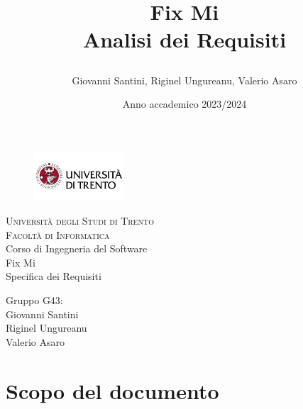 \documentclass{report}
\title{

	Fix Mi \\
	Analisi dei Requisiti
}
\author{Giovanni Santini, Riginel Ungureanu, Valerio Asaro}
\date{Anno accademico 2023/2024}
\begin{document}
	
	
	\begin{titlepage}
		\begin{figure}[t]
			\centering\includegraphics[width=0.3\textwidth]{images/unitn-logo}
		\end{figure}
		\begin{center}
			\textsc{ \LARGE{Università degli Studi di Trento \\}}
			\textsc{ \LARGE{Facoltà di Informatica\\ }}
			\textnormal{ \LARGE{Corso di Ingegneria del Software\\}}
			\vspace{30mm}
			\fontsize{10mm}{7mm}\selectfont 
			\textup{Fix Mi \\ Specifica dei Requisiti}\\
		\end{center}
		
		\vspace{25mm}
		
		\centering
		\large Gruppo G43: \\ Giovanni Santini\\ Riginel Ungureanu \\ Valerio Asaro
		
		\vspace{20mm}
		
		
	\end{titlepage}
	
	
	
	
	\pagestyle{fancy}
	\fancyhead[R]{\chaptername\ \thechapter}  %
	
	\tableofcontents
	\newpage
	
	
	
	\section{Scopo del documento}
	
\end{document}
